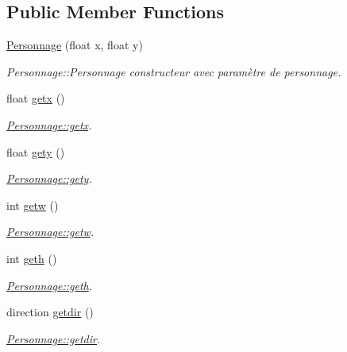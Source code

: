 \subsection*{Public Member Functions}
\begin{DoxyCompactItemize}
\item 
\hyperlink{class_personnage_ac0d494004d7fc8aac08112ff5ffacfe9}{Personnage} (float x, float y)
\begin{DoxyCompactList}\small\item\em Personnage\+::\+Personnage constructeur avec paramètre de personnage. \end{DoxyCompactList}\item 
float \hyperlink{class_personnage_a27cc1b2cd8f95546b646d5693157b3c6}{getx} ()
\begin{DoxyCompactList}\small\item\em \hyperlink{class_personnage_a27cc1b2cd8f95546b646d5693157b3c6}{Personnage\+::getx}. \end{DoxyCompactList}\item 
float \hyperlink{class_personnage_acaa6215bf06086ebf688e2b2e2e676f5}{gety} ()
\begin{DoxyCompactList}\small\item\em \hyperlink{class_personnage_acaa6215bf06086ebf688e2b2e2e676f5}{Personnage\+::gety}. \end{DoxyCompactList}\item 
int \hyperlink{class_personnage_aac0bd2c4c3bda5d26af8060f348e2b38}{getw} ()
\begin{DoxyCompactList}\small\item\em \hyperlink{class_personnage_aac0bd2c4c3bda5d26af8060f348e2b38}{Personnage\+::getw}. \end{DoxyCompactList}\item 
int \hyperlink{class_personnage_a29d38db07c8e6406caeea2fa832374af}{geth} ()
\begin{DoxyCompactList}\small\item\em \hyperlink{class_personnage_a29d38db07c8e6406caeea2fa832374af}{Personnage\+::geth}. \end{DoxyCompactList}\item 
direction \hyperlink{class_personnage_afff305624380f7fea61ea34d25a23db0}{getdir} ()
\begin{DoxyCompactList}\small\item\em \hyperlink{class_personnage_afff305624380f7fea61ea34d25a23db0}{Personnage\+::getdir}. \end{DoxyCompactList}\item 

\end{DoxyCompactItemize}

